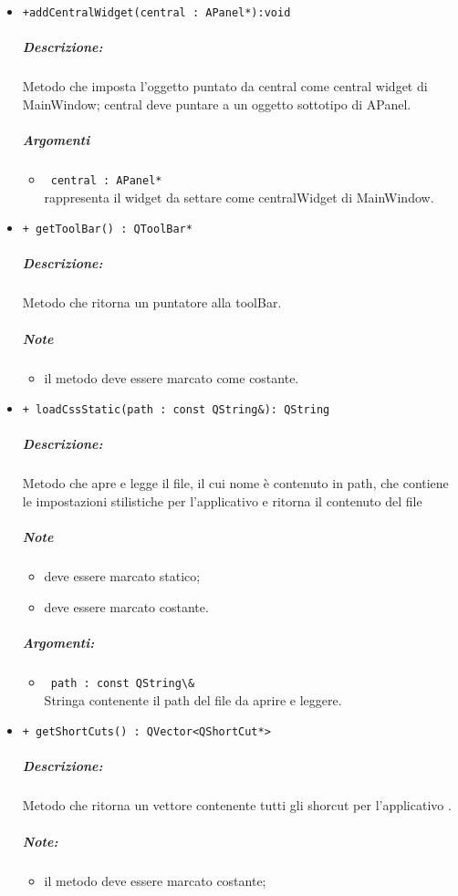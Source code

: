 \begin{itemize}
 
\item \color{blue}\verb!+addCentralWidget(central : APanel*):void !
\color{black}
\subparagraph{Descrizione:} Metodo che imposta l'oggetto puntato da central come central widget di MainWindow; central deve puntare a un oggetto sottotipo di APanel. \\
\subparagraph{Argomenti}
\begin{itemize}
\item \color{RoyalPurple}\verb! central : APanel* !\\ rappresenta il widget da settare come centralWidget di MainWindow.
\end{itemize}

\item \color{blue}\verb!+ getToolBar() : QToolBar* !
\color{black}
\subparagraph{Descrizione: }
Metodo che ritorna un puntatore alla toolBar.
\subparagraph{Note}
\begin{itemize}
\item il metodo deve essere marcato come costante.
\end{itemize}

\item \color{blue}\verb!+ loadCssStatic(path : const QString&): QString!
\color{black}
\subparagraph{Descrizione: }
 Metodo che apre e legge il file, il cui nome è contenuto in path, che contiene le impostazioni stilistiche per l'applicativo \project{} e ritorna il contenuto del file \\ 
 \subparagraph{Note}
 \begin{itemize}
 \item deve essere marcato statico;
 \item deve essere marcato costante.
 \end{itemize}
\subparagraph{Argomenti:}
\begin{itemize}
\item \color{RoyalPurple} \verb! path : const QString\& !\\ Stringa contenente il path del file da aprire e leggere.
\end{itemize}

\item \color{blue}\verb!+ getShortCuts() : QVector<QShortCut*> !
\color{black}
\subparagraph{Descrizione: }
Metodo che ritorna un vettore contenente tutti gli shorcut per l'applicativo \project{}.
\subparagraph{Note:}
\begin{itemize}
\item il metodo deve essere marcato costante;
\end{itemize}


\end{itemize}
